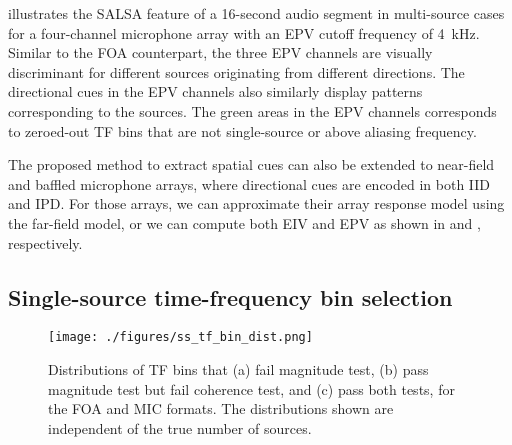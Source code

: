 \documentclass[journal]{IEEEtran}
\begin{document}
 illustrates the SALSA feature of a \num{16}-second audio segment in multi-source cases for a four-channel microphone array with an EPV cutoff frequency of \SI{4}{\kilo\hertz}. Similar to the FOA counterpart, the three EPV channels are visually discriminant for different sources originating from different directions. The directional cues in the EPV channels also similarly display patterns corresponding to the sources. The green areas in the EPV channels corresponds to zeroed-out TF bins that are not {single-source} or above aliasing frequency. 

The proposed method to extract spatial cues can also be extended to near-field and baffled microphone arrays, where directional cues are encoded in both IID and IPD. For those arrays, we can approximate their array response model using the far-field model, or we can compute both EIV and EPV as shown in  and , respectively.  


\subsection{Single-source time-frequency bin selection}
\label{subsec:ss_tf_selection}

\begin{figure}[tb]
    \centering
    \texttt{[image: ./figures/ss\_tf\_bin\_dist.png]}
    \vspace{-0.3cm}
    \caption{Distributions of TF bins that {(a)} fail magnitude test, {(b)} pass magnitude test but fail coherence test, and {(c)} pass both tests, for the FOA and MIC formats. The distributions shown are independent of the true number of sources.}
    \label{fig:tf_bin_dist}
\end{figure} 
\end{document}
